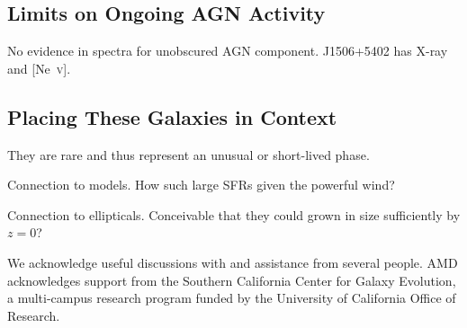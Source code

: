 \documentclass[apj]{emulateapj}
\newcommand{\nev}{[\textrm{Ne}~\textsc{v}]}
\begin{document}
\subsection{Limits on Ongoing AGN Activity}

No evidence in spectra for unobscured AGN component.  J1506+5402 has
X-ray and \nev.

\subsection{Placing These Galaxies in Context}

They are rare and thus represent an unusual or short-lived phase.  

Connection to models.  How such large SFRs given the powerful wind?  

Connection to ellipticals.  Conceivable that they could grown in size
sufficiently by $z=0$?

\acknowledgments

We acknowledge useful discussions with and assistance from several
people.  AMD acknowledges support from the Southern California Center
for Galaxy Evolution, a multi-campus research program funded by the
University of California Office of Research.

\end{document}
